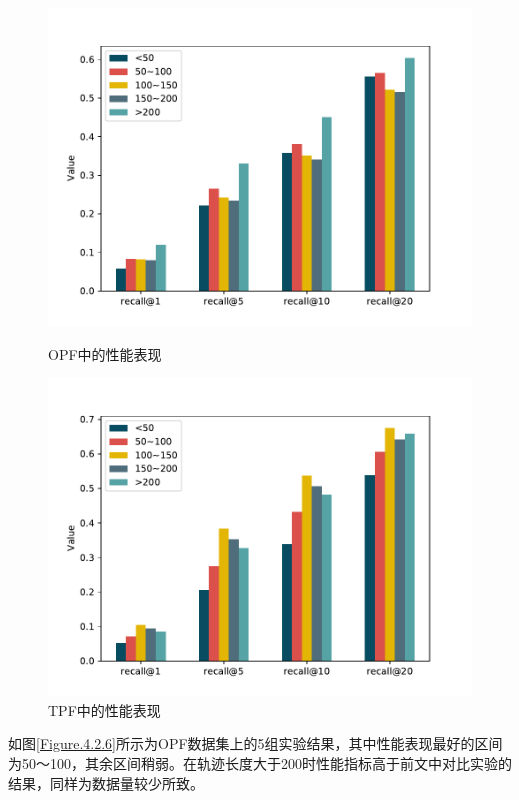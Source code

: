 \documentclass[master]{thesis-uestc}
\begin{document}
\begin{figure}[!ht]
\centering 
\begin{minipage}[b]{0.45\linewidth}
\centering
\includegraphics[width=0.98\linewidth]{./pic/figure-4-k.pdf}
\caption{OPF中的性能表现}
\label{Figure.4.2.6}
\end{minipage}
\begin{minipage}[b]{0.45\linewidth} 
\centering 
\includegraphics[width=0.98\linewidth]{./pic/figure-4-t.pdf}
\caption{TPF中的性能表现}
\label{Figure.4.2.7}
\end{minipage}
\end{figure}

如图\ref{Figure.4.2.6}所示为OPF数据集上的5组实验结果，其中性能表现最好的区间为50～100，其余区间稍弱。在轨迹长度大于200时性能指标高于前文中对比实验的结果，同样为数据量较少所致。
\end{document}
